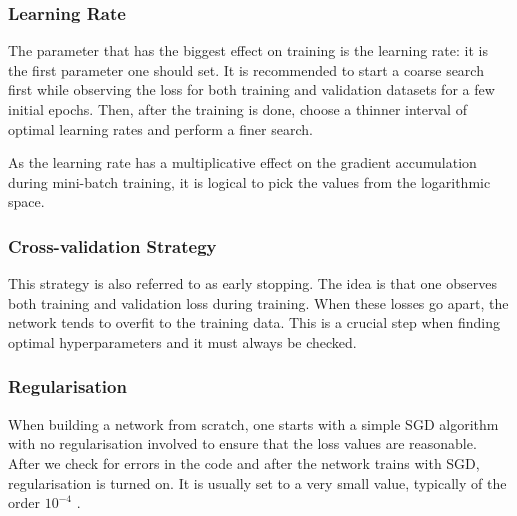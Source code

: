 \subsubsection{Learning Rate}

The parameter that has the biggest effect on training is the learning rate: it is the first parameter one should set. It is recommended to start a coarse search first while observing the loss for both training and validation datasets for a few initial epochs. Then, after the training is done, choose a thinner interval of optimal learning rates and perform a finer search. \cite{stanford-L6}

As the learning rate has a multiplicative effect on the gradient accumulation during mini-batch training, it is logical to pick the values from the logarithmic space. \cite{stanford-L6}

\subsubsection{Cross-validation Strategy}

This strategy is also referred to as early stopping. The idea is that one observes both training and validation loss during training. When these losses go apart, the network tends to overfit to the training data. This is a crucial step when finding optimal hyperparameters and it must always be checked. \cite{stanford-github}

\subsubsection{Regularisation}

When building a network from scratch, one starts with a simple SGD algorithm with no regularisation involved to ensure that the loss values are reasonable. After we check for errors in the code and after the network trains with SGD, regularisation is turned on. It is usually set to a very small value, typically of the order $ 10^{-4} $ \cite{stanford-L6}.



